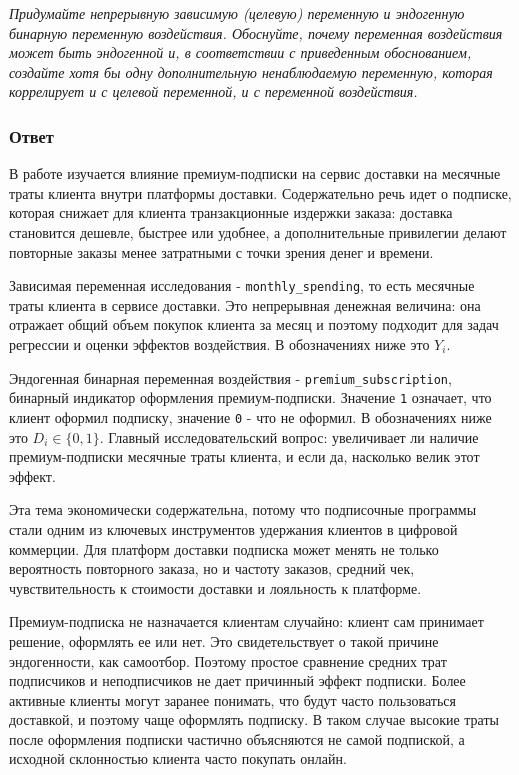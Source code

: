 \documentclass[11pt]{article}
\newenvironment{tasktext}
      {\begin{tcolorbox}[breakable, colback=black!3, colframe=black!28,
        boxrule=0.4pt, arc=1.5mm, left=7pt, right=7pt, top=5pt, bottom=5pt,
        before skip=0.35em, after skip=0.75em]\itshape}
      {\end{tcolorbox}}
\begin{document}
\begin{tasktext}
Придумайте непрерывную зависимую (целевую) переменную и эндогенную
бинарную переменную воздействия. Обоснуйте, почему переменная
воздействия может быть эндогенной и, в соответствии с приведенным
обоснованием, создайте хотя бы одну дополнительную ненаблюдаемую
переменную, которая коррелирует и с целевой переменной, и с переменной
воздействия.
\end{tasktext}

\subsubsection{Ответ}\label{ux43eux442ux432ux435ux442}

В работе изучается влияние премиум-подписки на сервис доставки на
месячные траты клиента внутри платформы доставки. Содержательно речь
идет о подписке, которая снижает для клиента транзакционные издержки
заказа: доставка становится дешевле, быстрее или удобнее, а
дополнительные привилегии делают повторные заказы менее затратными с
точки зрения денег и времени.

Зависимая переменная исследования - \texttt{monthly\_spending}, то есть
месячные траты клиента в сервисе доставки. Это непрерывная денежная
величина: она отражает общий объем покупок клиента за месяц и поэтому
подходит для задач регрессии и оценки эффектов воздействия. В
обозначениях ниже это \(Y_i\).

Эндогенная бинарная переменная воздействия -
\texttt{premium\_subscription}, бинарный индикатор оформления
премиум-подписки. Значение \texttt{1} означает, что клиент оформил
подписку, значение \texttt{0} - что не оформил. В обозначениях ниже это
\(D_i \in \{0,1\}\). Главный исследовательский вопрос: увеличивает ли
наличие премиум-подписки месячные траты клиента, и если да, насколько
велик этот эффект.

Эта тема экономически содержательна, потому что подписочные программы
стали одним из ключевых инструментов удержания клиентов в цифровой
коммерции. Для платформ доставки подписка может менять не только
вероятность повторного заказа, но и частоту заказов, средний чек,
чувствительность к стоимости доставки и лояльность к платформе.

Премиум-подписка не назначается клиентам случайно: клиент сам принимает
решение, оформлять ее или нет. Это свидетельствует о такой причине
эндогенности, как самоотбор. Поэтому простое сравнение средних трат
подписчиков и неподписчиков не дает причинный эффект подписки. Более
активные клиенты могут заранее понимать, что будут часто пользоваться
доставкой, и поэтому чаще оформлять подписку. В таком случае высокие
траты после оформления подписки частично объясняются не самой подпиской,
а исходной склонностью клиента часто покупать онлайн.
\end{document}
